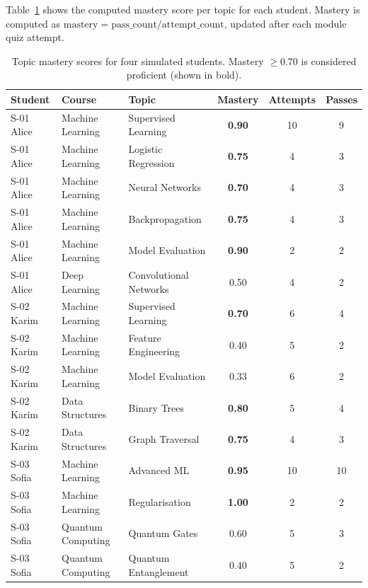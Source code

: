 \documentclass[12pt,a4paper]{article}
\begin{document}
Table~\ref{tab:mastery} shows the computed mastery score per topic for each
student. Mastery is computed as
$\text{mastery} = \text{pass\_count} / \text{attempt\_count}$, updated
after each module quiz attempt.

\begin{table}[H]
  \centering
  \caption{Topic mastery scores for four simulated students.
  Mastery $\geq 0.70$ is considered proficient (shown in bold).}
  \label{tab:mastery}
  \begin{tabular}{@{}lllccc@{}}
    \toprule
    \textbf{Student} & \textbf{Course} & \textbf{Topic} &
    \textbf{Mastery} & \textbf{Attempts} & \textbf{Passes} \\
    \midrule
    S-01 Alice & Machine Learning  & Supervised Learning      & \textbf{0.90} & 10 & 9 \\
    S-01 Alice & Machine Learning  & Logistic Regression      & \textbf{0.75} & 4  & 3 \\
    S-01 Alice & Machine Learning  & Neural Networks          & \textbf{0.70} & 4  & 3 \\
    S-01 Alice & Machine Learning  & Backpropagation          & \textbf{0.75} & 4  & 3 \\
    S-01 Alice & Machine Learning  & Model Evaluation         & \textbf{0.90} & 2  & 2 \\
    S-01 Alice & Deep Learning     & Convolutional Networks   & 0.50          & 4  & 2 \\
    \midrule
    S-02 Karim & Machine Learning  & Supervised Learning      & \textbf{0.70} & 6  & 4 \\
    S-02 Karim & Machine Learning  & Feature Engineering      & 0.40          & 5  & 2 \\
    S-02 Karim & Machine Learning  & Model Evaluation         & 0.33          & 6  & 2 \\
    S-02 Karim & Data Structures   & Binary Trees             & \textbf{0.80} & 5  & 4 \\
    S-02 Karim & Data Structures   & Graph Traversal          & \textbf{0.75} & 4  & 3 \\
    \midrule
    S-03 Sofia & Machine Learning  & Advanced ML              & \textbf{0.95} & 10 & 10 \\
    S-03 Sofia & Machine Learning  & Regularisation           & \textbf{1.00} & 2  & 2  \\
    S-03 Sofia & Quantum Computing & Quantum Gates            & 0.60          & 5  & 3  \\
    S-03 Sofia & Quantum Computing & Quantum Entanglement     & 0.40          & 5  & 2  \\

\end{tabular}
\end{table}
\end{document}
